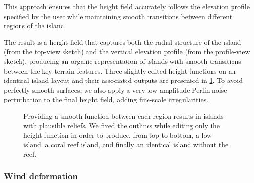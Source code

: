 This approach ensures that the height field accurately follows the elevation profile specified by the user while maintaining smooth transitions between different regions of the island.

The result is a height field that captures both the radial structure of the island (from the top-view sketch) and the vertical elevation profile (from the profile-view sketch), producing an organic representation of islands with smooth transitions between the key terrain features. Three slightly edited height functions on an identical island layout and their associated outputs are presented in \cref{fig:coral-island-procedural-smooth-heights}. To avoid perfectly smooth surfaces, we also apply a very low-amplitude Perlin noise perturbation to the final height field, adding fine-scale irregularities.

\begin{figure}
    \caption{Providing a smooth function between each region results in islands with plausible reliefs. We fixed the outlines while editing only the height function in order to produce, from top to bottom, a low island, a coral reef island, and finally an identical island without the reef.}
    \label{fig:coral-island-procedural-smooth-heights}
\end{figure}

\subsubsection{Wind deformation}
\label{sec:coral-island-wind-deformation}



